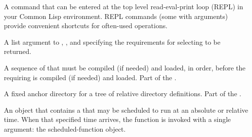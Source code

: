 \begin{glossary-list}

%
%
%
%
%
%
%
%
%
A  command that can be entered at the top level read-eval-print
loop (REPL) in your Common Lisp environment.  REPL commands (some with
arguments) provide convenient shortcuts for often-used operations.


%
%
%
%
%
%
%
A list argument to ,
, and
 specifying the
 requirements for selecting  to
be returned.


%
%
%
%
A sequence of  that must be compiled (if needed) and loaded, in
order, before the requiring  is compiled (if needed) and loaded.
Part of the .


%
%
%
%
%
%
%
A fixed anchor directory for a tree of relative directory definitions.
Part of the .


%
%
%
%
%
An object that contains a  that may be scheduled to run at an
absolute or relative time. When that specified time arrives, the function
is invoked with a single argument: the scheduled-function object.


\end{glossary-list}

